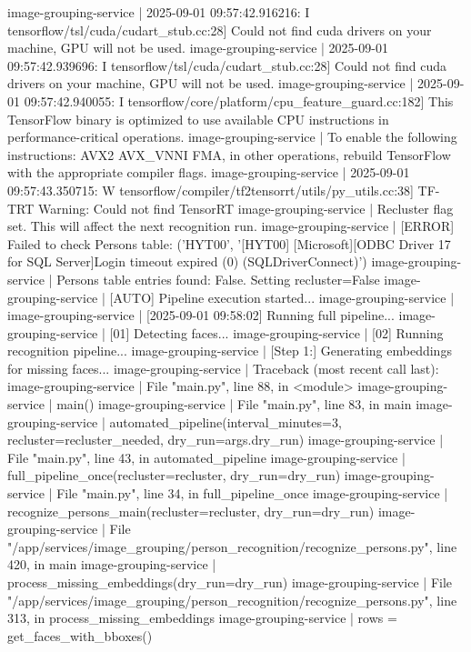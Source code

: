 image-grouping-service  | 2025-09-01 09:57:42.916216: I tensorflow/tsl/cuda/cudart_stub.cc:28] Could not find cuda drivers on your machine, GPU will not be used.
image-grouping-service  | 2025-09-01 09:57:42.939696: I tensorflow/tsl/cuda/cudart_stub.cc:28] Could not find cuda drivers on your machine, GPU will not be used.
image-grouping-service  | 2025-09-01 09:57:42.940055: I tensorflow/core/platform/cpu_feature_guard.cc:182] This TensorFlow binary is optimized to use available CPU instructions in performance-critical operations.
image-grouping-service  | To enable the following instructions: AVX2 AVX_VNNI FMA, in other operations, rebuild TensorFlow with the appropriate compiler flags.
image-grouping-service  | 2025-09-01 09:57:43.350715: W tensorflow/compiler/tf2tensorrt/utils/py_utils.cc:38] TF-TRT Warning: Could not find TensorRT
image-grouping-service  | Recluster flag set. This will affect the next recognition run.
image-grouping-service  | [ERROR] Failed to check Persons table: ('HYT00', '[HYT00] [Microsoft][ODBC Driver 17 for SQL Server]Login timeout expired (0) (SQLDriverConnect)')
image-grouping-service  | Persons table entries found: False. Setting recluster=False
image-grouping-service  | [AUTO] Pipeline execution started...
image-grouping-service  |
image-grouping-service  | [2025-09-01 09:58:02] Running full pipeline...
image-grouping-service  | [01] Detecting faces...
image-grouping-service  | [02] Running recognition pipeline...
image-grouping-service  | [Step 1:] Generating embeddings for missing faces...
image-grouping-service  | Traceback (most recent call last):
image-grouping-service  |   File "main.py", line 88, in <module>
image-grouping-service  |     main()
image-grouping-service  |   File "main.py", line 83, in main
image-grouping-service  |     automated_pipeline(interval_minutes=3, recluster=recluster_needed, dry_run=args.dry_run)
image-grouping-service  |   File "main.py", line 43, in automated_pipeline
image-grouping-service  |     full_pipeline_once(recluster=recluster, dry_run=dry_run)
image-grouping-service  |   File "main.py", line 34, in full_pipeline_once
image-grouping-service  |     recognize_persons_main(recluster=recluster, dry_run=dry_run)
image-grouping-service  |   File "/app/services/image_grouping/person_recognition/recognize_persons.py", line 420, in main
image-grouping-service  |     process_missing_embeddings(dry_run=dry_run)
image-grouping-service  |   File "/app/services/image_grouping/person_recognition/recognize_persons.py", line 313, in process_missing_embeddings
image-grouping-service  |     rows = get_faces_with_bboxes()
